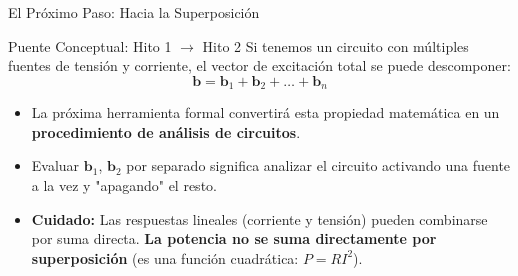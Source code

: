 \documentclass[aspectratio=169, table, xcdraw]{beamer}
\begin{document}
\begin{frame}{El Próximo Paso: Hacia la Superposición}
    \begin{block}{Puente Conceptual: Hito 1 $\rightarrow$ Hito 2}
        Si tenemos un circuito con múltiples fuentes de tensión y corriente, el vector de excitación total se puede descomponer:
        \begin{equation*}
            \bm{b} = \bm{b}_1 + \bm{b}_2 + \dots + \bm{b}_n
        \end{equation*}
    \end{block}
    
    \begin{itemize}
        \item La próxima herramienta formal convertirá esta propiedad matemática en un \textbf{procedimiento de análisis de circuitos}.
        \item Evaluar $\bm{b}_1$, $\bm{b}_2$ por separado significa analizar el circuito activando una fuente a la vez y "apagando" el resto.
        \item \textbf{Cuidado:} Las respuestas lineales (corriente y tensión) pueden combinarse por suma directa. \textbf{La potencia no se suma directamente por superposición} (es una función cuadrática: $P = RI^2$).
    \end{itemize}
\end{frame}
\end{document}
